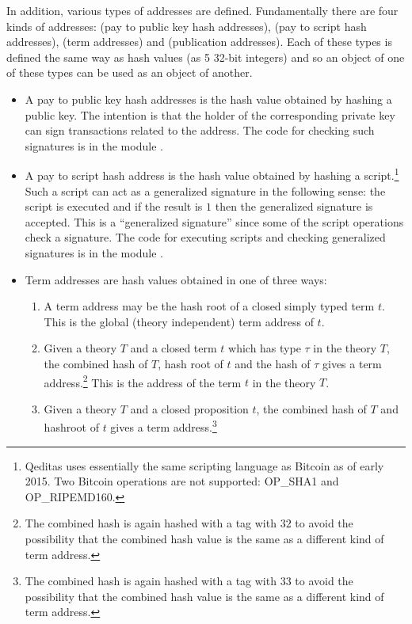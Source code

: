 In addition, various types of addresses are defined.
Fundamentally there are four kinds of addresses:
{} (pay to public key hash addresses), {} (pay to script hash addresses),
{} (term addresses) and {} (publication addresses).
Each of these types is defined the same way as hash values (as 5 32-bit integers)
and so an object of one of these types can be used as an object of another.
\begin{itemize}
\item {} A pay to public key hash addresses is the hash value
obtained by hashing a public key. The intention is that the holder of the corresponding private key
can sign transactions related to the address.
The code for checking such signatures is in the module {}.
\item {} A pay to script hash address is the hash value
obtained by hashing a script.\footnote{Qeditas uses essentially the same scripting language as Bitcoin as of early 2015. Two Bitcoin operations are not supported: OP\_SHA1 and OP\_RIPEMD160.}
Such a script can act as a generalized signature in the following sense:
the script is executed and if the result is $1$ then the generalized signature is accepted.
This is a ``generalized signature'' since some of the script operations check a signature.
The code for executing scripts and checking generalized signatures is in the module {}.
\item {}
Term addresses are hash values obtained in one of three ways:
\begin{enumerate}
\item A term address may be the hash root of a closed simply typed term $t$.
This is the global (theory independent) term address of $t$.
\item Given a theory $T$ and a closed term $t$ which has type $\tau$ in the theory $T$,
the combined hash of $T$, hash root of $t$ and the hash of $\tau$
gives a term address.\footnote{The combined hash is again hashed with a tag with $32$ to avoid the possibility that the combined hash value is the same as a different kind of term address.}
This is the address of the term $t$ in the theory $T$.
\item Given a theory $T$ and a closed proposition $t$,
the combined hash of $T$ and hashroot of $t$
gives a term address.\footnote{The combined hash is again hashed with a tag with $33$ to avoid the possibility that the combined hash value is the same as a different kind of term address.}

\end{enumerate}
\end{itemize}
